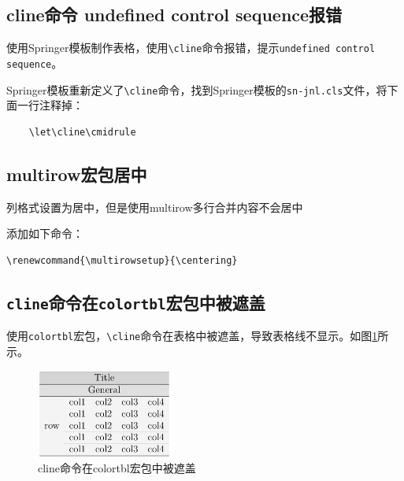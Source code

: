 \subsection{cline命令 undefined control sequence报错}\label{subsec:cline-undefined-control-sequence-error}
使用Springer模板制作表格，使用\lstinline{\cline}命令报错，提示\lstinline{undefined control sequence}。

Springer模板重新定义了\lstinline{\cline}命令，找到Springer模板的\lstinline{sn-jnl.cls}文件，将下面一行注释掉：
\begin{lstlisting}
    \let\cline\cmidrule
\end{lstlisting}

\subsection{multirow宏包居中}\label{subsec:multirow-center}

列格式设置为居中，但是使用multirow多行合并内容不会居中

添加如下命令：
\begin{lstlisting}
\renewcommand{\multirowsetup}{\centering}
\end{lstlisting}

\subsection{\lstinline|cline|命令在\lstinline|colortbl|宏包中被遮盖}\label{subsec:cline-colortbl-error}
使用\lstinline{colortbl}宏包，\lstinline{\cline}命令在表格中被遮盖，导致表格线不显示。如图\ref{fig:cline-colortbl-error}所示。

\begin{figure}[!h]
    \centering
    \includegraphics[width=0.4\textwidth]{figure/chap-tab/cline-colortbl-error.png}
    \caption{{cline}命令在{colortbl}宏包中被遮盖}
    \label{fig:cline-colortbl-error}
\end{figure}

